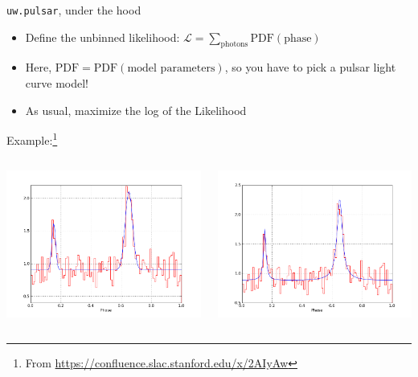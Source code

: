 \documentclass[12pt]{beamer}
\begin{document}
\begin{frame}{\texttt{uw.pulsar}, under the hood}
  \begin{itemize}
   \item Define the unbinned likelihood: $\mathcal{L} = \sum_\text{photons}\text{PDF}(\text{phase})$
   \item Here, $\text{PDF}=\text{PDF}(\text{model parameters})$, so you have to pick a pulsar light curve model!
   \item As usual, maximize the log of the Likelihood
  \end{itemize}

  Example:\footnote{From \url{https://confluence.slac.stanford.edu/x/2AIyAw}}
  \begin{columns}

    \includegraphics[width=1\textwidth]{plots/template_example_gauss.png}

    \includegraphics[width=1\textwidth]{plots/template_example_lorentzian.png}
  \end{columns}
\end{frame}
\end{document}
